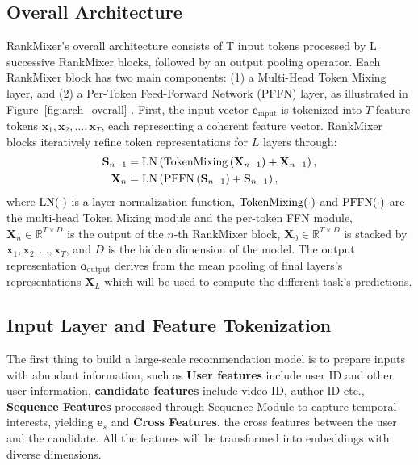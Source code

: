  \subsection{Overall Architecture}
    RankMixer’s overall architecture consists of T input tokens processed by L successive RankMixer blocks, followed by an output pooling operator. Each RankMixer block has two main components: (1) a Multi-Head Token Mixing layer, and (2) a Per-Token Feed-Forward Network (PFFN) layer, as illustrated in Figure~\ref{fig:arch_overall} . 
    First, the input vector $\mathbf{e}_{\text{input}}$ is tokenized into $T$ feature tokens $\mathbf{x}_1, \mathbf{x}_2, ..., \mathbf{x}_T$, each representing a coherent feature vector.
    RankMixer blocks iteratively refine token representations for $L$ layers through:
    \begin{equation}
    \begin{split}
        \mathbf{S}_{n-1} &= {\rm LN}\left({\rm TokenMixing} \left( \mathbf{X}_{n-1} \right) +  \mathbf{X}_{n-1}\right),\\
         \mathbf{X}_{n} &= {\rm LN} \left({\rm PFFN} \left( \mathbf{S}_{n-1} \right)  +\mathbf{S}_{n-1} \right),
    \end{split}
    \end{equation}
    where ${\rm LN}(\cdot)$ is a layer normalization function, ${\rm TokenMixing}(\cdot)$ and ${\rm PFFN}(\cdot)$ are the multi-head Token Mixing module and the per-token FFN module, $\mathbf{X}_{n} \in \mathbb{R}^{T \times D}$ is the output of the $n$-th RankMixer block, $\mathbf{X}_{0} \in \mathbb{R}^{T \times D}$ is stacked by $\mathbf{x}_1, \mathbf{x}_2, ..., \mathbf{x}_T$, and $D$ is the hidden dimension of the model. 
    The output representation $\mathbf{o}_{\text{output}}$ derives from the mean pooling of final layers's representations $\mathbf{X}_{L}$ which will be used to compute the different task's predictions.  

\subsection{Input Layer and Feature Tokenization}

The first thing to build a large-scale recommendation model is to prepare inputs with abundant information, such as \textbf{User features} include user ID and other user information, \textbf{candidate features} include video ID, author ID etc., \textbf{Sequence Features}  processed through Sequence Module \cite{din,longer} to capture temporal interests, yielding $\mathbf{e}_s$ and \textbf{Cross Features}. the cross features between the user and the candidate. All the features will be transformed into embeddings with diverse dimensions.  

